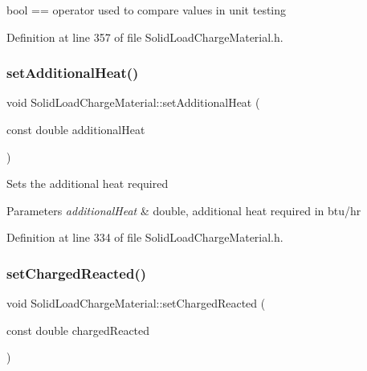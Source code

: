bool == operator used to compare values in unit testing 

Definition at line 357 of file Solid\+Load\+Charge\+Material.\+h.

\mbox{\label{class_solid_load_charge_material_a849fd29a3ecb95be2e9d34f9280b1b94}} 
\subsubsection{\texorpdfstring{set\+Additional\+Heat()}{setAdditionalHeat()}}
{\footnotesize\ttfamily void Solid\+Load\+Charge\+Material\+::set\+Additional\+Heat (\begin{DoxyParamCaption}\item[{const double}]{additional\+Heat }\end{DoxyParamCaption})\hspace{0.3cm}{\ttfamily [inline]}}

Sets the additional heat required 
\begin{DoxyParams}{Parameters}
{\em additional\+Heat} & double, additional heat required in btu/hr \\
\hline
\end{DoxyParams}


Definition at line 334 of file Solid\+Load\+Charge\+Material.\+h.

\mbox{\label{class_solid_load_charge_material_a38f3b832ff29f779a78a51fd7352fcd4}} 
\subsubsection{\texorpdfstring{set\+Charged\+Reacted()}{setChargedReacted()}}
{\footnotesize\ttfamily void Solid\+Load\+Charge\+Material\+::set\+Charged\+Reacted (\begin{DoxyParamCaption}\item[{const double}]{charged\+Reacted }\end{DoxyParamCaption})\hspace{0.3cm}{\ttfamily [inline]}}

